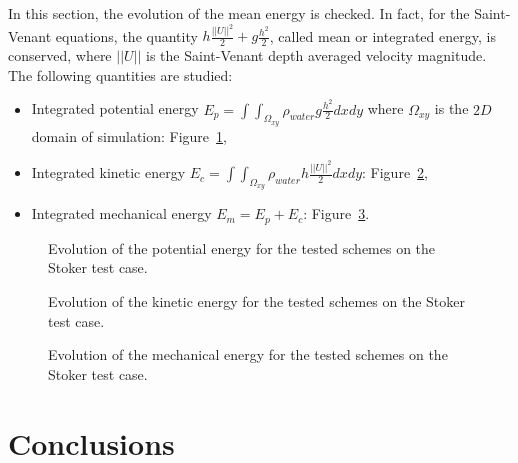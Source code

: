 In this section, the evolution of the mean energy is checked.
In fact, for the Saint-Venant equations, 
the quantity $h \frac{||U||^2}{2} + g \frac{h^2}{2}$, called mean or integrated
energy, is conserved,
where $||U||$ is the Saint-Venant depth averaged velocity magnitude.
The following quantities are studied:
\begin{itemize}
\item Integrated potential energy
  \textbf{$E_p =\int\int_{\Omega_{xy}}\rho_{water} g \frac{h^2}{2} dxdy$} where
  $\Omega_{xy}$ is the $2D$ domain of simulation: Figure~\ref{fig:stoker:Ep},
\item Integrated kinetic energy
  \textbf{$E_c =\int\int_{\Omega_{xy}} \rho_{water} h \frac{||U||^2}{2} dxdy$}:
  Figure~\ref{fig:stoker:Ec},
\item Integrated mechanical energy \textbf{$E_m = E_p + E_c$}:
  Figure~\ref{fig:stoker:Em}.
\end{itemize}

\begin{figure}[H]
\centering
  \caption{Evolution of the potential energy for the tested schemes on the Stoker test case.}
\label{fig:stoker:Ep}
\end{figure}

\begin{figure}[H]
\centering
  \caption{Evolution of the kinetic energy for the tested schemes on the Stoker test case.}
\label{fig:stoker:Ec}
\end{figure}

\begin{figure}[H]
\centering
  \caption{Evolution of the mechanical energy for the tested schemes on the Stoker test case.}
\label{fig:stoker:Em}
\end{figure}

\section{Conclusions}

